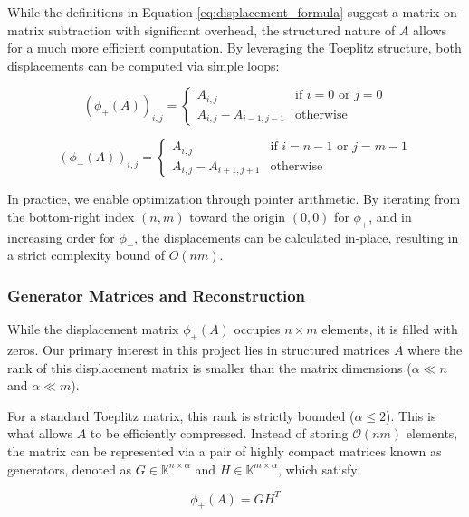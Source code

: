 While the definitions in Equation \eqref{eq:displacement_formula}
suggest a matrix-on-matrix subtraction with significant overhead, the
structured nature of $A$ allows for a much more efficient
computation. By leveraging the Toeplitz structure, both displacements
can be computed via simple loops:

\begin{equation} \label{imp:phi_plus}
  (\phi_+(A))_{i,j} =
  \begin{cases}
    A_{i,j}                & \text{if } i=0 \text{ or } j=0 \\
    A_{i,j} - A_{i-1, j-1} & \text{otherwise}
  \end{cases}
\end{equation}

\begin{equation} \label{imp:phi_minus}
  (\phi_-(A))_{i,j} =
  \begin{cases}
    A_{i,j}                & \text{if } i=n-1 \text{ or } j=m-1 \\
    A_{i,j} - A_{i+1, j+1} & \text{otherwise}
  \end{cases}
\end{equation}

In practice, we enable optimization through pointer arithmetic. By
iterating from the bottom-right index $(n, m)$ toward the origin $(0,
0)$ for $\phi_+$, and in increasing order for $\phi_-$, the
displacements can be calculated in-place, resulting in a strict
complexity bound of $O(nm)$.

\subsubsection{Generator Matrices and Reconstruction}

While the displacement matrix $\phi_+(A)$ occupies $n
\times m$ elements, it is filled with zeros. Our primary interest in
this project lies in structured matrices $A$ where
the rank of this displacement matrix is smaller than
the matrix dimensions ($\alpha \ll n$ and $\alpha \ll m$).

For a standard Toeplitz matrix, this rank is strictly bounded
($\alpha \le 2$). This is what allows $A$ to be efficiently
compressed. Instead of storing $\mathcal{O}(nm)$ elements, the matrix
can be represented via a pair of highly compact matrices known as
generators, denoted as $G \in \mathbb{K}^{n \times \alpha}$ and $H
\in \mathbb{K}^{m \times \alpha}$, which satisfy:

\begin{equation}
  \phi_+(A) = G H^T
\end{equation}

